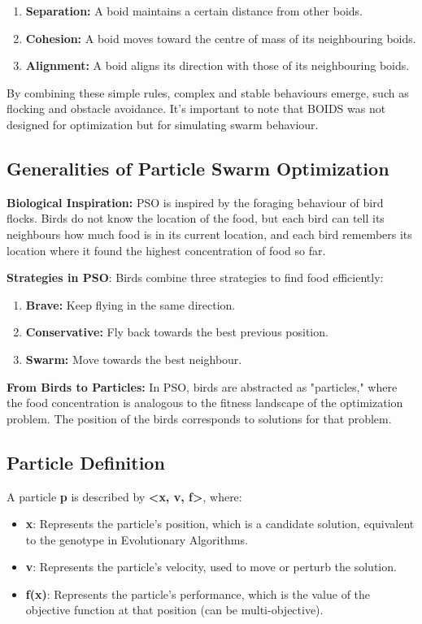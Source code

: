 \begin{enumerate}
    \item \textbf{Separation:} A boid maintains a certain distance from other boids.
    \item \textbf{Cohesion:} A boid moves toward the centre of mass of its neighbouring boids.
    \item \textbf{Alignment:} A boid aligns its direction with those of its neighbouring boids.
\end{enumerate}
By combining these simple rules, complex and stable behaviours emerge, such as flocking and obstacle avoidance. It's important to note that BOIDS was not designed for optimization but for simulating swarm behaviour.

\subsection*{Generalities of Particle Swarm Optimization}
\textbf{Biological Inspiration:} PSO is inspired by the foraging behaviour of bird flocks. Birds do not know the location of the food, but each bird can tell its neighbours how much food is in its current location, and each bird remembers its location where it found the highest concentration of food so far.

\textbf{Strategies in PSO}: Birds combine three strategies to find food efficiently:

\begin{enumerate}
    \item \textbf{Brave:} Keep flying in the same direction.
    \item \textbf{Conservative:} Fly back towards the best previous position.
    \item \textbf{Swarm:} Move towards the best neighbour.
\end{enumerate}
\textbf{From Birds to Particles:} In PSO, birds are abstracted as "particles," where the food concentration is analogous to the fitness landscape of the optimization problem. The position of the birds corresponds to solutions for that problem.

\subsection*{Particle Definition}
A particle \textbf{p} is described by \textbf{<x, v, f>}, where:

\begin{itemize}
    \item \textbf{x}: Represents the particle’s position, which is a candidate solution, equivalent to the genotype in Evolutionary Algorithms.
    \item \textbf{v}: Represents the particle’s velocity, used to move or perturb the solution.
    \item \textbf{f(x)}: Represents the particle’s performance, which is the value of the objective function at that position (can be multi-objective).
\end{itemize}


